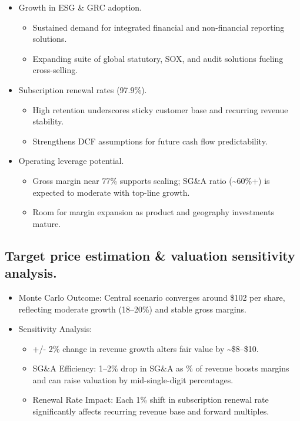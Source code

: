 \documentclass[
  10pt,
  a4paper,
]{article}
\providecommand{\tightlist}{%
  \setlength{\itemsep}{0pt}\setlength{\parskip}{0pt}}\usepackage{longtable,booktabs,array}
\begin{document}
\begin{itemize}
\tightlist
\item
  Growth in ESG \& GRC adoption.

  \begin{itemize}
  \tightlist
  \item
    Sustained demand for integrated financial and non-financial
    reporting solutions.
  \item
    Expanding suite of global statutory, SOX, and audit solutions
    fueling cross-selling.
  \end{itemize}
\item
  Subscription renewal rates (97.9\%).

  \begin{itemize}
  \tightlist
  \item
    High retention underscores sticky customer base and recurring
    revenue stability.
  \item
    Strengthens DCF assumptions for future cash flow predictability.
  \end{itemize}
\item
  Operating leverage potential.

  \begin{itemize}
  \tightlist
  \item
    Gross margin near 77\% supports scaling; SG\&A ratio
    (\textasciitilde60\%+) is expected to moderate with top-line growth.
  \item
    Room for margin expansion as product and geography investments
    mature.
  \end{itemize}
\end{itemize}

\subsection{Target price estimation \& valuation sensitivity
analysis.}\label{target-price-estimation-valuation-sensitivity-analysis.}

\begin{itemize}
\tightlist
\item
  Monte Carlo Outcome: Central scenario converges around \$102 per
  share, reflecting moderate growth (18--20\%) and stable gross margins.
\item
  Sensitivity Analysis:

  \begin{itemize}
  \tightlist
  \item
    +/- 2\% change in revenue growth alters fair value by
    \textasciitilde\$8--\$10.
  \item
    SG\&A Efficiency: 1--2\% drop in SG\&A as \% of revenue boosts
    margins and can raise valuation by mid-single-digit percentages.
  \item
    Renewal Rate Impact: Each 1\% shift in subscription renewal rate
    significantly affects recurring revenue base and forward multiples.
  \end{itemize}
\end{itemize}
\end{document}
